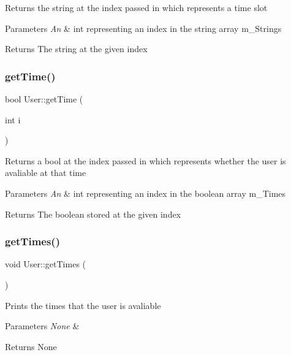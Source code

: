 Returns the string at the index passed in which represents a time slot 
\begin{DoxyParams}{Parameters}
{\em An} & int representing an index in the string array m\+\_\+\+Strings \\
\hline
\end{DoxyParams}
\begin{DoxyReturn}{Returns}
The string at the given index 
\end{DoxyReturn}
\mbox{\label{class_user_ab4ba945b0431a19fef9710b16aac4bb5}} 
\subsubsection{\texorpdfstring{get\+Time()}{getTime()}}
{\footnotesize\ttfamily bool User\+::get\+Time (\begin{DoxyParamCaption}\item[{int}]{i }\end{DoxyParamCaption})}

Returns a bool at the index passed in which represents whether the user is avaliable at that time 
\begin{DoxyParams}{Parameters}
{\em An} & int representing an index in the boolean array m\+\_\+\+Times \\
\hline
\end{DoxyParams}
\begin{DoxyReturn}{Returns}
The boolean stored at the given index 
\end{DoxyReturn}
\mbox{\label{class_user_a70486059b5ee29b656c8331583cdd5b5}} 
\subsubsection{\texorpdfstring{get\+Times()}{getTimes()}}
{\footnotesize\ttfamily void User\+::get\+Times (\begin{DoxyParamCaption}{ }\end{DoxyParamCaption})}

Prints the times that the user is avaliable 
\begin{DoxyParams}{Parameters}
{\em None} & \\
\hline
\end{DoxyParams}
\begin{DoxyReturn}{Returns}
None 
\end{DoxyReturn}
\mbox{\label{class_user_a3fcf5814ba0a2415862c892746585a46}} 
